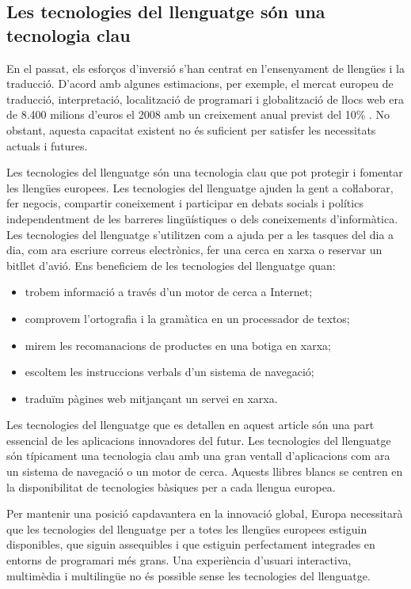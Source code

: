 \begin{multicols}{2}
\subsection{Les tecnologies del llenguatge són una tecnologia clau}

En el passat, els esforços d’inversió s’han centrat en l’ensenyament de llengües i la traducció. D’acord amb algunes estimacions, per exemple, el mercat europeu de traducció, interpretació, localització de programari i globalització de llocs web era de 8.400 milions d’euros el 2008 amb un creixement anual previst del 10\% \cite{CAT-Nota3}. No obstant, aquesta capacitat existent no és suficient per satisfer les necessitats actuals i futures. 

Les tecnologies del llenguatge són una tecnologia clau que pot protegir i fomentar les llengües europees. Les tecnologies del llenguatge ajuden la gent a coŀlaborar, fer negocis, compartir coneixement i participar en debats socials i polítics independentment de les barreres lingüístiques o dels coneixements d’informàtica. Les tecnologies del llenguatge s’utilitzen com a ajuda per a les tasques del dia a dia, com ara escriure correus electrònics, fer una cerca en xarxa o reservar un bitllet d’avió. Ens beneficiem de les tecnologies del llenguatge quan:   
\begin{itemize}
\item trobem informació a través d’un motor de cerca a Internet;
\item comprovem l’ortografia i la gramàtica en un processador de textos;
\item mirem les recomanacions de productes en una botiga en xarxa;
\item escoltem les instruccions verbals d'un sistema de navegació;
\item traduïm pàgines web mitjançant un servei en xarxa.
\end{itemize}

Les tecnologies del llenguatge que es detallen en aquest article són una part essencial de les aplicacions innovadores del futur. Les tecnologies del llenguatge són típicament una tecnologia clau amb una gran ventall d’aplicacions com ara un sistema de navegació o un motor de cerca. Aquests llibres blancs se centren en la disponibilitat de tecnologies bàsiques per a cada llengua europea.


Per mantenir una posició capdavantera en la innovació global, Europa necessitarà que les tecnologies del llenguatge per a totes les llengües europees estiguin disponibles, que siguin assequibles i que estiguin perfectament integrades en entorns de programari més grans.  Una experiència d’usuari interactiva, multimèdia i multilingüe no és possible sense les tecnologies del llenguatge.


\end{multicols}
